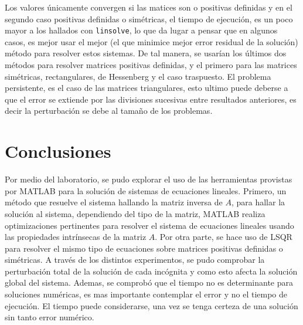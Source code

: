 \documentclass[11pt, spanish]{article}
\begin{document}
\begin{enumerate}
Los valores únicamente convergen si las matices son o positivas definidas y en el segundo caso positivas definidas o simétricas, el tiempo de ejecución, es un poco mayor a los hallados con \texttt{linsolve}, lo que da lugar a pensar que en algunos casos, es mejor usar el mejor (el que minimice mejor error residual de la solución) método para resolver estos sistemas. De tal manera, se usarían los últimos dos métodos para resolver matrices positivas definidas, y el primero para las matrices simétricas, rectangulares, de Hessenberg y el caso traspuesto. El problema persistente, es el caso de las matrices triangulares, esto ultimo puede deberse a que el error se extiende por las divisiones sucesivas entre resultados anteriores, es decir la perturbación se debe al tamaño de los problemas.





\end{enumerate}

\newpage



\section{Conclusiones}

Por medio del laboratorio, se pudo explorar el uso de las herramientas provistas por \textsc{MATLAB} para la solución de sistemas de ecuaciones lineales. Primero, un método que resuelve el sistema hallando la matriz inversa de $A$, para hallar la solución al sistema, dependiendo del tipo de la matriz, \textsc{MATLAB} realiza optimizaciones pertinentes para resolver el sistema de ecuaciones lineales usando las propiedades intrínsecas de la matriz $A$. Por otra parte, se hace uso de \textsc{LSQR} para resolver el mismo tipo de ecuaciones sobre matrices positivas definidas o simétricas. A través de los distintos experimentos, se pudo comprobar la perturbación total de la solución de cada incógnita y como esto afecta la solución global del sistema. Ademas, se comprobó que el tiempo no es determinante para soluciones numéricas, es mas importante contemplar el error y no el tiempo de ejecución. El tiempo puede considerarse, una vez se tenga certeza de una solución sin tanto error numérico.
\end{document}
